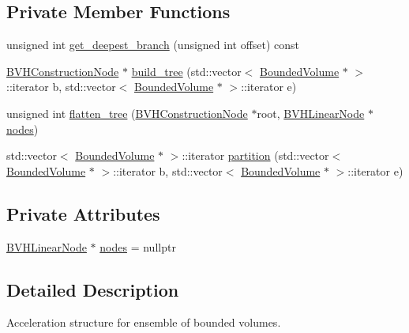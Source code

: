 \subsection*{Private Member Functions}
\begin{DoxyCompactItemize}
\item 
unsigned int \mbox{\hyperlink{classBinaryVolumeHierarchy_aa2f4b148ce800faf6aaf9ae9b616089d}{get\+\_\+deepest\+\_\+branch}} (unsigned int offset) const
\item 
\mbox{\hyperlink{structBVHConstructionNode}{B\+V\+H\+Construction\+Node}} $\ast$ \mbox{\hyperlink{classBinaryVolumeHierarchy_aa9c190d6301f6fe7ba5b9c77d9517ec4}{build\+\_\+tree}} (std\+::vector$<$ \mbox{\hyperlink{classBoundedVolume}{Bounded\+Volume}} $\ast$ $>$\+::iterator b, std\+::vector$<$ \mbox{\hyperlink{classBoundedVolume}{Bounded\+Volume}} $\ast$ $>$\+::iterator e)
\item 
unsigned int \mbox{\hyperlink{classBinaryVolumeHierarchy_a975a30c71deb503c9f64248b8f14c8cf}{flatten\+\_\+tree}} (\mbox{\hyperlink{structBVHConstructionNode}{B\+V\+H\+Construction\+Node}} $\ast$root, \mbox{\hyperlink{structBVHLinearNode}{B\+V\+H\+Linear\+Node}} $\ast$\mbox{\hyperlink{classBinaryVolumeHierarchy_abbadac5cecbdedd8df30cd294ff0ed29}{nodes}})
\item 
std\+::vector$<$ \mbox{\hyperlink{classBoundedVolume}{Bounded\+Volume}} $\ast$ $>$\+::iterator \mbox{\hyperlink{classBinaryVolumeHierarchy_ab30dec4aa6ef808f53bbdedb98d8af65}{partition}} (std\+::vector$<$ \mbox{\hyperlink{classBoundedVolume}{Bounded\+Volume}} $\ast$ $>$\+::iterator b, std\+::vector$<$ \mbox{\hyperlink{classBoundedVolume}{Bounded\+Volume}} $\ast$ $>$\+::iterator e)
\end{DoxyCompactItemize}
\subsection*{Private Attributes}
\begin{DoxyCompactItemize}
\item 
\mbox{\hyperlink{structBVHLinearNode}{B\+V\+H\+Linear\+Node}} $\ast$ \mbox{\hyperlink{classBinaryVolumeHierarchy_abbadac5cecbdedd8df30cd294ff0ed29}{nodes}} = nullptr
\end{DoxyCompactItemize}


\subsection{Detailed Description}
Acceleration structure for ensemble of bounded volumes. 


